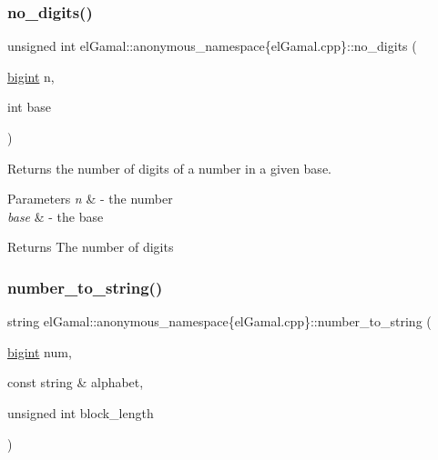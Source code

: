 \subsubsection{\texorpdfstring{no\+\_\+digits()}{no\_digits()}}
{\footnotesize\ttfamily unsigned int el\+Gamal\+::anonymous\+\_\+namespace\{el\+Gamal.\+cpp\}\+::no\+\_\+digits (\begin{DoxyParamCaption}\item[{\mbox{\hyperlink{namespaceelGamal_ab2883bf41ce8d738e2428c8ae81b0245}{bigint}}}]{n,  }\item[{int}]{base }\end{DoxyParamCaption})}



Returns the number of digits of a number in a given base. 


\begin{DoxyParams}{Parameters}
{\em n} & -\/ the number \\
\hline
{\em base} & -\/ the base\\
\hline
\end{DoxyParams}
\begin{DoxyReturn}{Returns}
The number of digits 
\end{DoxyReturn}
\mbox{\label{namespaceelGamal_1_1anonymous__namespace_02elGamal_8cpp_03_ae7b9cdc894b5646eb4b76ee13e509cd5}} 
\subsubsection{\texorpdfstring{number\+\_\+to\+\_\+string()}{number\_to\_string()}}
{\footnotesize\ttfamily string el\+Gamal\+::anonymous\+\_\+namespace\{el\+Gamal.\+cpp\}\+::number\+\_\+to\+\_\+string (\begin{DoxyParamCaption}\item[{\mbox{\hyperlink{namespaceelGamal_ab2883bf41ce8d738e2428c8ae81b0245}{bigint}}}]{num,  }\item[{const string \&}]{alphabet,  }\item[{unsigned int}]{block\+\_\+length }\end{DoxyParamCaption})}



